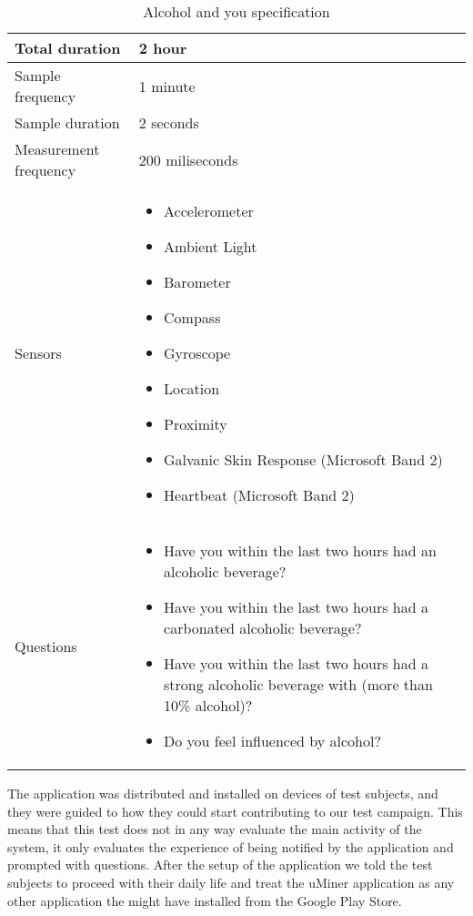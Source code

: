 \begin{table}[!htbp]
    \centering
	\begin{tabular}{|m{}|m{}|} \hline
	Total duration        & 2 hour            \\ \hline
	Sample frequency      & 1 minute          \\ \hline
	Sample duration       & 2 seconds         \\ \hline
	Measurement frequency & 200 miliseconds   \\ \hline
	Sensors               & \begin{itemize}[noitemsep]
								\item Accelerometer 
								\item Ambient Light
								\item Barometer
								\item Compass
								\item Gyroscope
								\item Location
								\item Proximity
								\item Galvanic Skin Response (Microsoft Band 2)
								\item Heartbeat (Microsoft Band 2)
							\end{itemize}                \\ \hline
	Questions             & \begin{itemize}[noitemsep]
								\item Have you within the last two hours had an alcoholic beverage?
								\item Have you within the last two hours had a carbonated alcoholic beverage?
								\item Have you within the last two hours had a strong alcoholic beverage with (more than 10\% alcohol)?
								\item Do you feel influenced by alcohol?
							\end{itemize}                \\ \hline
	\end{tabular}
	\caption{Alcohol and you specification}
	\label{tab:test_campaign_spec}
\end{table}
\FloatBarrier

The application was distributed and installed on devices of test subjects, and they were guided to how they could start contributing to our test campaign. This means that this test does not in any way evaluate the main activity of the system, it only evaluates the experience of being notified by the application and prompted with questions. After the setup of the application we told the test subjects to proceed with their daily life and treat the uMiner application as any other application the might have installed from the Google Play Store. 

